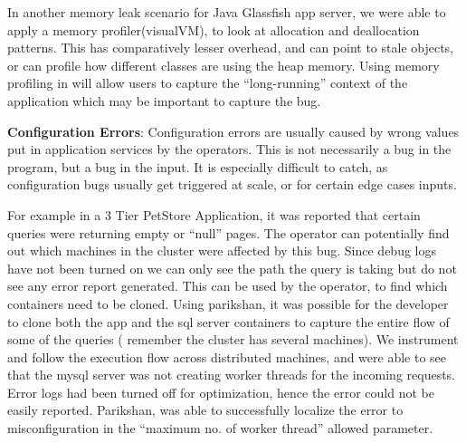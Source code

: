 In another memory leak scenario for Java Glassfish\cite{glassfish} app server, we were able to apply a memory profiler(visualVM), to look at allocation and deallocation patterns.
This has comparatively lesser overhead, and can point to stale objects, or can profile how different classes are using the heap memory.
Using memory profiling in \parikshan will allow users to capture the ``long-running'' context of the application which may be important to capture the bug.


\textbf{Configuration Errors}:
Configuration errors are usually caused by wrong values put in application services by the operators.
This is not necessarily a bug in the program, but a bug in the input.
It is especially difficult to catch, as configuration bugs usually get triggered at scale, or for certain edge cases inputs.

For example in a 3 Tier PetStore Application, it was reported that certain queries were returning empty or ``null'' pages. 
The operator can potentially find out which machines in the cluster were affected by this bug.
Since debug logs have not been turned on we can only see the path the query is taking but do not see any error report generated.
This can be used by the operator, to find which containers need to be cloned. 
Using parikshan, it was possible for the developer to clone both the app and the sql server containers to capture the entire flow of some of the queries ( remember the cluster has several machines).
We instrument and follow the execution flow across distributed machines, and were able to see that the mysql server was not creating worker threads for the incoming requests.
Error logs had been turned off for optimization, hence the error could not be easily reported. 
Parikshan, was able to successfully localize the error to misconfiguration in the ``maximum no. of worker thread'' allowed parameter.



